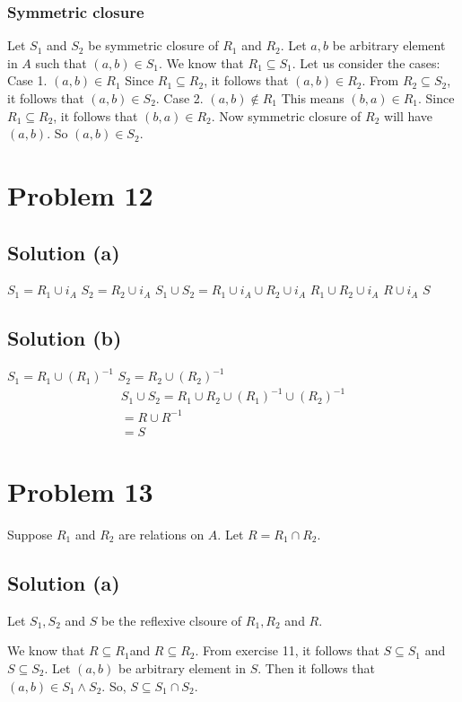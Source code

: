 \documentclass{article}
\begin{document}
\subsubsection{Symmetric closure}
Let $S_1$ and $S_2$ be symmetric closure of $R_1$ and $R_2$. Let $a,b$
be arbitrary element in $A$ such that $(a,b) \in S_1$. We know that
$R_1 \subseteq S_1$. Let us consider the cases:
Case 1. $(a,b) \in R_1$ Since $R_1 \subseteq R_2$, it follows that
$(a,b) \in R_2$. From $R_2 \subseteq S_2$, it follows that $(a,b) \in
S_2$.
Case 2. $(a,b) \notin R_1$ This means $(b,a) \in R_1$. Since $R_1
\subseteq R_2$, it follows that $(b,a) \in R_2$. Now symmetric closure
of $R_2$ will have $(a,b)$. So $(a,b) \in S_2$.

\section{Problem 12}
\subsection{Solution (a)}
$S_1 = R_1 \cup i_A$
$S_2 = R_2 \cup i_A$
$S_1 \cup S_2 = R_1 \cup i_A \cup R_2 \cup i_A$
$R_1 \cup R_2 \cup i_A$
$R \cup i_A$
$S$

\subsection{Solution (b)}
$S_1 = R_1 \cup (R_1)^{-1}$
$S_2 = R_2 \cup (R_2)^{-1}$
\begin{align*}
  S_1 \cup S_2 = R_1 \cup R_2 \cup (R_1)^{-1} \cup (R_2)^{-1} \\
  = R \cup R^{-1} \\
  = S
\end{align*}

\section{Problem 13}
Suppose $R_1$ and $R_2$ are relations on $A$. Let $R = R_1 \cap R_2$.

\subsection{Solution (a)}
Let $S_1, S_2$ and $S$ be the reflexive clsoure of $R_1, R_2$ and $R$.

We know that $R \subseteq R_1$and $R \subseteq R_2$. From exercise 11,
it follows that $S \subseteq S_1 $ and $S \subseteq S_2$. Let $(a,b)$
be arbitrary element in $S$. Then it follows that $(a,b) \in S_1 \land
S_2$. So, $S \subseteq S_1 \cap S_2$.
\end{document}
